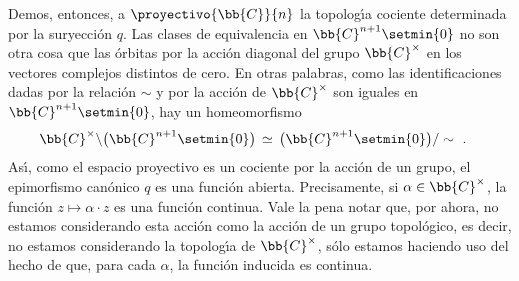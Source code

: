 \begin{ejemplo}
	Demos, entonces, a $\proyectivo{\bb{C}}{n}$ la topolog\'{\i}a
	cociente determinada por la suryecci\'{o}n $q$. Las clases de
	equivalencia en $\bb{C}^{n+1}\setmin\{0\}$ no son otra cosa
	que las \'{o}rbitas por la acci\'{o}n diagonal del grupo
	$\bb{C}^{\times}$ en los vectores complejos distintos de cero.
	En otras palabras, como las identificaciones dadas por la
	relaci\'{o}n $\sim$ y por la acci\'{o}n de $\bb{C}^{\times}$ son
	iguales en $\bb{C}^{n+1}\setmin\{0\}$, hay un homeomorfismo
	\begin{align*}
		\bb{C}^{\times}\backslash\big(\bb{C}^{n+1}\setmin\{0\}\big)
			 & \,\simeq\, \big(\bb{C}^{n+1}\setmin\{0\}\big)/\sim
		 \text{ .}
	\end{align*}
	As\'{\i}, como el espacio proyectivo es un cociente por la
	acci\'{o}n de un grupo, el epimorfismo can\'{o}nico $q$ es
	una funci\'{o}n abierta. Precisamente, si $\alpha\in\bb{C}^{\times}$,
	la funci\'{o}n $z\mapsto\alpha\cdot z$ es una funci\'{o}n continua.
	Vale la pena notar que, por ahora, no estamos considerando esta
	acci\'{o}n como la acci\'{o}n de un grupo topol\'{o}gico, es decir,
	no estamos considerando la topolog\'{\i}a de $\bb{C}^{\times}$,
	s\'{o}lo estamos haciendo uso del hecho de que, para cada $\alpha$,
	la funci\'{o}n inducida es continua.
	

\end{ejemplo}
